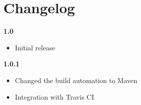 \chapter{Changelog}

\textbf{1.0}
\begin{itemize}
	\renewcommand{\labelitemi}{$\bullet$}
	\item Initial release
\end{itemize}

\textbf{1.0.1}
\begin{itemize}
	\renewcommand{\labelitemi}{$\bullet$}
	\item Changed the build automation to Maven
	\item Integration with Travis CI
\end{itemize}






